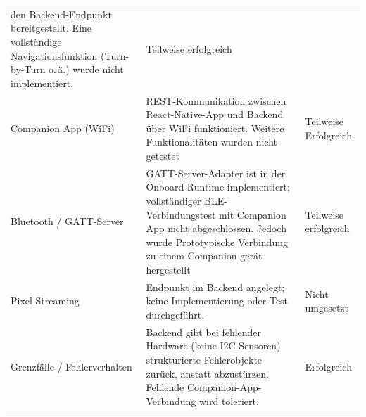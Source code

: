 \begin{table}[htbp]
\begin{tabularx}{\textwidth}{@{} l X l @{}}
      den Backend-Endpunkt bereitgestellt.
      Eine vollständige Navigationsfunktion (Turn-by-Turn o.\,ä.)
      wurde nicht implementiert. &
      Teilweise erfolgreich \\
    \addlinespace
    Companion App (WiFi) &
      REST-Kommunikation zwischen React-Native-App und Backend
      über WiFi funktioniert. Weitere Funktionalitäten wurden nicht getestet &
      Teilweise Erfolgreich \\
    \addlinespace
    Bluetooth / GATT-Server &
      GATT-Server-Adapter ist in der Onboard-Runtime implementiert;
      vollständiger BLE-Verbindungstest mit Companion App nicht
      abgeschlossen. Jedoch wurde Prototypische Verbindung zu einem Companion gerät hergestellt &
      Teilweise erfolgreich \\
    \addlinespace
    Pixel Streaming &
      Endpunkt im Backend angelegt; keine Implementierung oder
      Test durchgeführt. &
      Nicht umgesetzt \\
    \addlinespace
    Grenzfälle / Fehlerverhalten &
      Backend gibt bei fehlender Hardware (keine I2C-Sensoren)
      strukturierte Fehlerobjekte zurück, anstatt abzustürzen.
      Fehlende Companion-App-Verbindung wird toleriert. &
      Erfolgreich \\
    \bottomrule
  \end{tabularx}
\end{table}